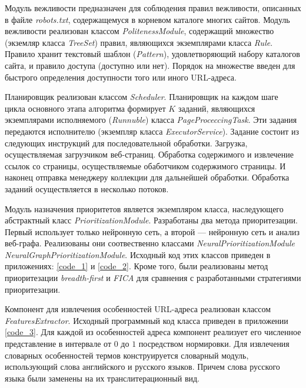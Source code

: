 Модуль вежливости предназначен для соблюдения правил вежливости, описанных в файле \textit{robots.txt}, содержащемуся в корневом каталоге многих сайтов. Модуль вежливости реализован классом \textit{PolitenessModule}, содержащий множество (экземляр класса \textit{TreeSet}) правил, являющихся экземплярами класса \textit{Rule}. Правило хранит текстовый шаблон (\textit{Pattern}), удовлетворяющий набору каталогов сайта, и правило доступа (доступно или нет). Порядок на множестве введен для быстрого определения доступности того или иного URL-адреса.

Планировщик реализован классом \textit{Scheduler}. Планировщик на каждом шаге цикла основного этапа алгоритма формирует $K$ заданий, являющихся экземплярами исполняемого (\textit{Runnuble}) класса \textit{PageProceccingTask}. Эти задания передаются исполнителю (экземпляр класса \textit{ExecutorService}). Задание состоит из следующих инструкций для последовательной обработки. Загрузка, осуществляемая загрузчиком веб-страниц. Обработка содержимого и извлечение ссылок со страницы, осуществляемые обаботчиком содержимого страницы. И наконец отправка менеджеру коллекции для дальнейшей обработки. Обработка заданий осуществляется в несколько потоков.

Модуль назначения приоритетов является экземпляром класса, наследующего абстрактный класс \textit{PrioritizationModule}. Разработаны два метода приоритезации. Первый использует только нейронную сеть, а второй --- нейронную сеть и анализ веб-графа. Реализованы они соотвественно классами \textit{NeuralPrioritizationModule} \textit{NeuralGraphPrioritizationModule}. Исходный код этих классов приведен в приложениях: \ref{code_1} и \ref{code_2}. Кроме того, были реализованы метод приоритезации \textit{breadth-first} и \textit{FICA} для сравнения с разработанными стратегиями приоритезации.

Компонент для извлечения особенностей URL-адреса реализован классом \textit{FeaturesExtractor}. Исходный программный код класса приведен в приложении \ref{code_3}. Для каждой из особенностей адреса компонент реализует его численное представление в интервале от $0$ до $1$ посредством нормировки. Для извлечения словарных особенностей термов конструируется словарный модуль, использующий слова английского и русского языков. Причем слова русского языка были заменены на их транслитерационный вид.

